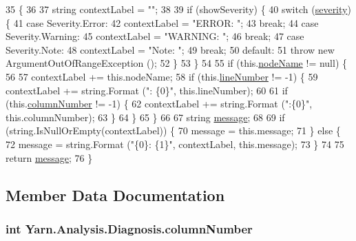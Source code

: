 \begin{DoxyCode}
35         \{
36 
37             \textcolor{keywordtype}{string} contextLabel = \textcolor{stringliteral}{""};
38 
39             \textcolor{keywordflow}{if} (showSeverity) \{
40                 \textcolor{keywordflow}{switch} (\hyperlink{a00081_ad90ffa839ce0f568a099bb37b4a6c4da}{severity}) \{
41                 \textcolor{keywordflow}{case} Severity.Error:
42                     contextLabel = \textcolor{stringliteral}{"ERROR: "};
43                     \textcolor{keywordflow}{break};
44                 \textcolor{keywordflow}{case} Severity.Warning:
45                     contextLabel = \textcolor{stringliteral}{"WARNING: "};
46                     \textcolor{keywordflow}{break};
47                 \textcolor{keywordflow}{case} Severity.Note:
48                     contextLabel = \textcolor{stringliteral}{"Note: "};
49                     \textcolor{keywordflow}{break};
50                 \textcolor{keywordflow}{default}:
51                     \textcolor{keywordflow}{throw} \textcolor{keyword}{new} ArgumentOutOfRangeException ();
52                 \}
53             \}
54 
55             \textcolor{keywordflow}{if} (this.\hyperlink{a00081_a662aca4ad2af5116c2cf6773daf1a847}{nodeName} != null) \{
56 
57                 contextLabel += this.nodeName;
58                 \textcolor{keywordflow}{if} (this.\hyperlink{a00081_a0bd73f1c684bfd66ae7b6bef8f2972d0}{lineNumber} != -1) \{
59                     contextLabel += string.Format (\textcolor{stringliteral}{": \{0\}"}, this.lineNumber);
60 
61                     \textcolor{keywordflow}{if} (this.\hyperlink{a00081_a658e7fb05555c0f9ab5f80057bdc1408}{columnNumber} != -1) \{
62                         contextLabel += string.Format (\textcolor{stringliteral}{":\{0\}"}, this.columnNumber);
63                     \}
64                 \}
65             \}
66 
67             \textcolor{keywordtype}{string} \hyperlink{a00081_ac7ed070dddd2613c08e7874ea5afb3af}{message};
68 
69             \textcolor{keywordflow}{if} (\textcolor{keywordtype}{string}.IsNullOrEmpty(contextLabel)) \{
70                 message = this.message;
71             \} \textcolor{keywordflow}{else} \{
72                 message = string.Format (\textcolor{stringliteral}{"\{0\}: \{1\}"}, contextLabel, this.message);
73             \}
74 
75             \textcolor{keywordflow}{return} \hyperlink{a00081_ac7ed070dddd2613c08e7874ea5afb3af}{message};
76         \}
\end{DoxyCode}


\subsection{Member Data Documentation}
\hypertarget{a00081_a658e7fb05555c0f9ab5f80057bdc1408}{
\subsubsection[{column\-Number}]{\setlength{\rightskip}{0pt plus 5cm}int Yarn.\-Analysis.\-Diagnosis.\-column\-Number}}\label{a00081_a658e7fb05555c0f9ab5f80057bdc1408}


